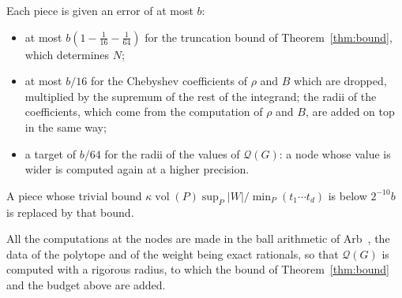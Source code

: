 \documentclass[11pt]{article}
\theoremstyle{remark}
\newcommand{\vol}{\operatorname{vol}}
\begin{document}
Each piece is given an error of at most $b$:
\begin{itemize}
\item at most $b(1 - \frac1{16} - \frac1{64})$ for the truncation bound of
  Theorem~\ref{thm:bound}, which determines $N$;
\item at most $b/16$ for the Chebyshev coefficients of $\rho$ and $B$
  which are dropped, multiplied by the supremum of the rest of the
  integrand; the radii of the coefficients, which come from the computation
  of $\rho$ and $B$, are added on top in the same way;
\item a target of $b/64$ for the radii of the values of $\mathcal{Q}(G)$:
  a node whose value is wider is computed again at a higher precision.
\end{itemize}
A piece whose trivial bound $\kappa \vol(P) \sup_P |W| / \min_P (t_1
\cdots t_d)$ is below $2^{-10} b$ is replaced by that bound.

All the computations at the nodes are made in the ball arithmetic of
Arb~\cite{Arb}, the data of the polytope and of the weight being exact
rationals, so that $\mathcal{Q}(G)$ is computed with a rigorous radius, to
which the bound of Theorem~\ref{thm:bound} and the budget above are added.
\end{document}
